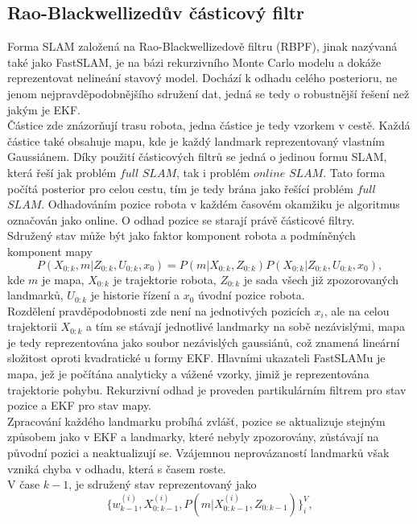 \documentclass[12pt]{article}
\begin{document}
\subsection{Rao-Blackwellizedův částicový filtr}
Forma SLAM založená na Rao-Blackwellizedově filtru (RBPF), jinak nazývaná také jako FastSLAM, je na bázi rekurzivního Monte Carlo modelu a dokáže reprezentovat nelineání stavový model. Dochází k odhadu celého posterioru, ne jenom nejpravděpodobnějšího sdružení dat, jedná se tedy o robustnější řešení než jakým je EKF. \\
\indent Částice zde znázorňují trasu robota, jedna částice je tedy vzorkem v cestě. Každá částice také obsahuje mapu, kde je každý landmark reprezentovaný vlastním Gaussiánem. Díky použití částicových filtrů se jedná o jedinou formu SLAM, která řeší jak problém $full$ $SLAM$, tak i problém $online$ $SLAM$. Tato forma počítá posterior pro celou cestu, tím je tedy brána jako řešící problém $full$ $SLAM$. Odhadováním pozice robota v každém časovém okamžiku je algoritmus označován jako online. O odhad pozice se starají právě částicové filtry.\\
\indent Sdružený stav může být jako faktor komponent robota a podmíněných komponent mapy
\begin{equation}
	P(X_{0:k},m|Z_{0:k},U_{0:k},x_0)=P(m|X_{0:k},Z_{0:k})P(X_{0:k}|Z_{0:k},U_{0:k},x_0),
\end{equation}
kde $m$ je mapa, $X_{0:k}$ je trajektorie robota, $Z_{0:k}$ je sada všech již zpozorovaných landmarků, $U_{0:k}$ je historie řízení a $x_0$ úvodní pozice robota.\\
\indent Rozdělení pravděpodobnosti zde není na jednotivých pozicích $x_i$, ale na celou trajektorii $X_{0:k}$ a tím se stávají jednotlivé landmarky na sobě nezávislými, mapa je tedy reprezentována jako soubor nezávislých gaussiánů, což znamená lineární složitost oproti kvadratické u formy EKF. Hlavními ukazateli FastSLAMu je mapa, jež je počítána analyticky a vážené vzorky, jimiž je reprezentována trajektorie pohybu. Rekurzivní odhad je proveden partikulárním filtrem pro stav pozice a EKF pro stav mapy.\\
\indent Zpracování každého landmarku probíhá zvlášť, pozice se aktualizuje stejným způsobem jako v EKF a landmarky, které nebyly zpozorovány, zůstávají na původní pozici a neaktualizují se. Vzájemnou neprovázaností landmarků však vzniká chyba v odhadu, která s časem roste.\\
\indent V čase $k-1$, je sdružený stav reprezentovaný jako 
\begin{equation}
	\{w^{(i)}_{k-1},X^{(i)}_{0:k-1},P(m|X^{(i)}_{0:k-1},Z_{0:k-1})\}^V_i,
\end{equation}
\end{document}
